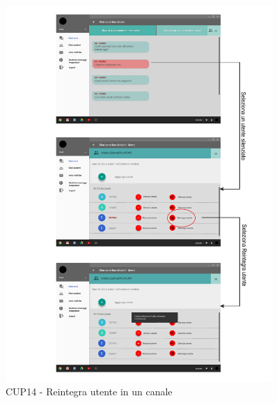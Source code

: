 \begin{figure}
	\centering
	\includegraphics[width=0.9\textwidth]{imgs/gruppo6/activities/act_cup14_reintegra_utente.pdf}
	\caption{CUP14 - Reintegra utente in un canale}
	\label{fig:cup14}
\end{figure}


